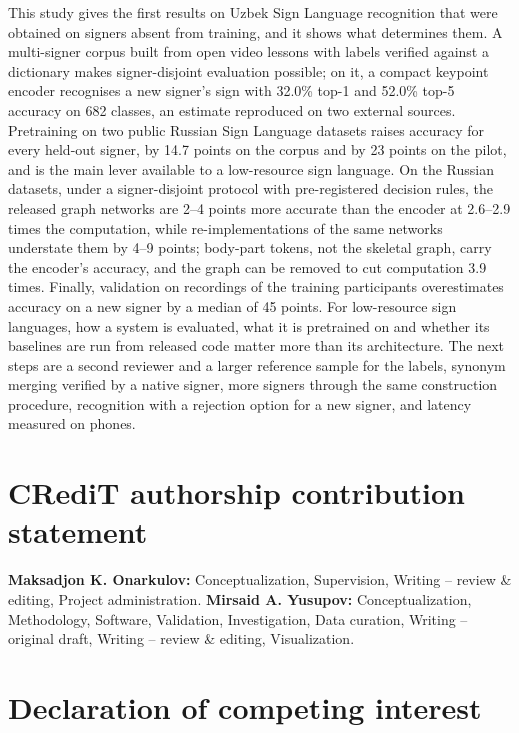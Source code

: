 This study gives the first results on Uzbek Sign Language recognition that were obtained on signers absent from training, and it shows what determines them. A multi-signer corpus built from open video lessons with labels verified against a dictionary makes signer-disjoint evaluation possible; on it, a compact keypoint encoder recognises a new signer's sign with 32.0\% top-1 and 52.0\% top-5 accuracy on 682 classes, an estimate reproduced on two external sources. Pretraining on two public Russian Sign Language datasets raises accuracy for every held-out signer, by 14.7 points on the corpus and by 23 points on the pilot, and is the main lever available to a low-resource sign language. On the Russian datasets, under a signer-disjoint protocol with pre-registered decision rules, the released graph networks are 2--4 points more accurate than the encoder at 2.6--2.9 times the computation, while re-implementations of the same networks understate them by 4--9 points; body-part tokens, not the skeletal graph, carry the encoder's accuracy, and the graph can be removed to cut computation 3.9 times. Finally, validation on recordings of the training participants overestimates accuracy on a new signer by a median of 45 points. For low-resource sign languages, how a system is evaluated, what it is pretrained on and whether its baselines are run from released code matter more than its architecture. The next steps are a second reviewer and a larger reference sample for the labels, synonym merging verified by a native signer, more signers through the same construction procedure, recognition with a rejection option for a new signer, and latency measured on phones.

\hypertarget{credit-authorship-contribution-statement}{%
\section{CRediT authorship contribution statement}\label{credit-authorship-contribution-statement}}

\textbf{Maksadjon K. Onarkulov:} Conceptualization, Supervision, Writing -- review \& editing, Project administration. \textbf{Mirsaid A. Yusupov:} Conceptualization, Methodology, Software, Validation, Investigation, Data curation, Writing -- original draft, Writing -- review \& editing, Visualization.

\hypertarget{declaration-of-competing-interest}{%
\section{Declaration of competing interest}\label{declaration-of-competing-interest}}


